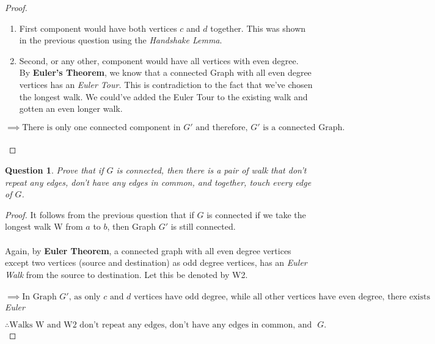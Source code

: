 \documentclass{article}
\newtheorem{question}{Question}
\begin{document}
\begin{proof}
\begin{enumerate}
    \item First component would have both vertices $c$ and $d$ together. This was shown in the previous question using the \textit{Handshake Lemma}.
    \item Second, or any other, component would have all vertices with even degree.\\
    By \textbf{Euler's Theorem}, we know that a connected Graph with all even degree vertices has an \textit{Euler Tour.} This is contradiction to the fact that we've chosen the longest walk. We could've added the Euler Tour to the existing walk and gotten an even longer walk.
    \end{enumerate}

    $\implies \text{There is only one connected component in $G'$ and therefore, $G'$ is a connected Graph.}$\\
    \\
\end{proof}
\pagebreak
\begin{question}
    Prove that if $G$ is connected, then there is a pair of walk that don’t repeat any edges, don’t have any edges in common, and together, touch every edge of $G$.
\end{question}
\begin{proof}
    It follows from the previous question that if $G$ is connected if we take the longest walk W from $a$ to $b$, then Graph $G'$ is still connected.
    \\ \\
    Again, by \textbf{Euler Theorem}, a connected graph with all even degree vertices except two vertices (source and destination) as odd degree vertices, has an \textit{Euler Walk} from the source to destination. Let this be denoted by W2.
    \\ \\
    $\implies \text{In Graph $G'$, as only $c$ and $d$ vertices have odd degree, while all other vertices have even degree, there exists an}$ \\ \textit{Euler} 
    
    $\therefore \text{Walks W and W2 don't repeat any edges, don't have any edges in common, and together, touch every edge of Graph $G$.}$
\end{proof}
\end{document}
